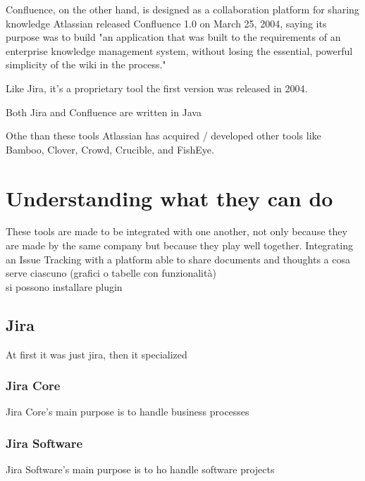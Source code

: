Confluence, on the other hand, is designed as a collaboration platform for sharing knowledge
Atlassian released Confluence 1.0 on March 25, 2004, saying its purpose was to build "an application that was built to the requirements of an enterprise knowledge management system, without losing the essential, powerful simplicity of the wiki in the process."

Like Jira, it's a proprietary tool the first version was released in 2004.

Both Jira and Confluence are written in Java

Othe than these tools Atlassian has acquired / developed other tools like Bamboo, Clover, Crowd, Crucible, and FishEye.

\section{Understanding what they can do}
These tools are made to be integrated with one another, not only because they are made by the same company but because they play well together.
Integrating an Issue Tracking with a platform able to share documents and thoughts
a cosa serve ciascuno (grafici o tabelle con funzionalità)\\
si possono installare plugin
	
	\subsection{Jira}
	
		At first it was just jira, then it specialized
	
		\subsubsection{Jira Core}
			Jira Core's main purpose is to handle business processes 
			
		\subsubsection{Jira Software}
			Jira Software's main purpose is to ho handle software projects
		
